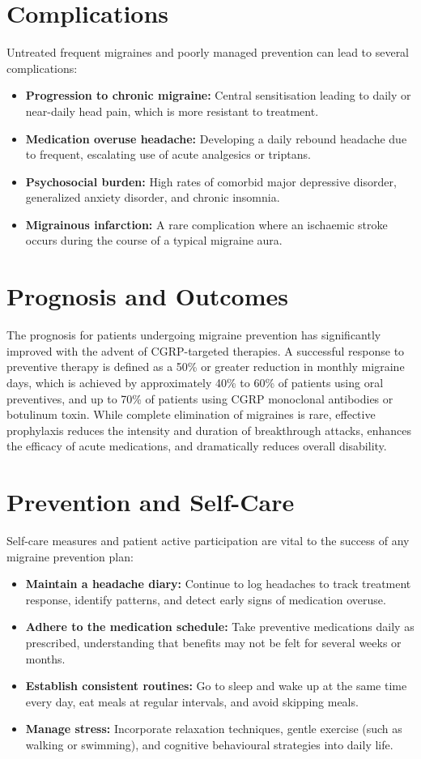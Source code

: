 \section*{Complications}
Untreated frequent migraines and poorly managed prevention can lead to several complications:
\begin{itemize}
    \item \textbf{Progression to chronic migraine:} Central sensitisation leading to daily or near-daily head pain, which is more resistant to treatment.
    \item \textbf{Medication overuse headache:} Developing a daily rebound headache due to frequent, escalating use of acute analgesics or triptans.
    \item \textbf{Psychosocial burden:} High rates of comorbid major depressive disorder, generalized anxiety disorder, and chronic insomnia.
    \item \textbf{Migrainous infarction:} A rare complication where an ischaemic stroke occurs during the course of a typical migraine aura.
\end{itemize}

\section*{Prognosis and Outcomes}
The prognosis for patients undergoing migraine prevention has significantly improved with the advent of CGRP-targeted therapies. A successful response to preventive therapy is defined as a 50\% or greater reduction in monthly migraine days, which is achieved by approximately 40\% to 60\% of patients using oral preventives, and up to 70\% of patients using CGRP monoclonal antibodies or botulinum toxin. While complete elimination of migraines is rare, effective prophylaxis reduces the intensity and duration of breakthrough attacks, enhances the efficacy of acute medications, and dramatically reduces overall disability.

\section*{Prevention and Self-Care}
Self-care measures and patient active participation are vital to the success of any migraine prevention plan:
\begin{itemize}
    \item \textbf{Maintain a headache diary:} Continue to log headaches to track treatment response, identify patterns, and detect early signs of medication overuse.
    \item \textbf{Adhere to the medication schedule:} Take preventive medications daily as prescribed, understanding that benefits may not be felt for several weeks or months.
    \item \textbf{Establish consistent routines:} Go to sleep and wake up at the same time every day, eat meals at regular intervals, and avoid skipping meals.
    \item \textbf{Manage stress:} Incorporate relaxation techniques, gentle exercise (such as walking or swimming), and cognitive behavioural strategies into daily life.
\end{itemize}

